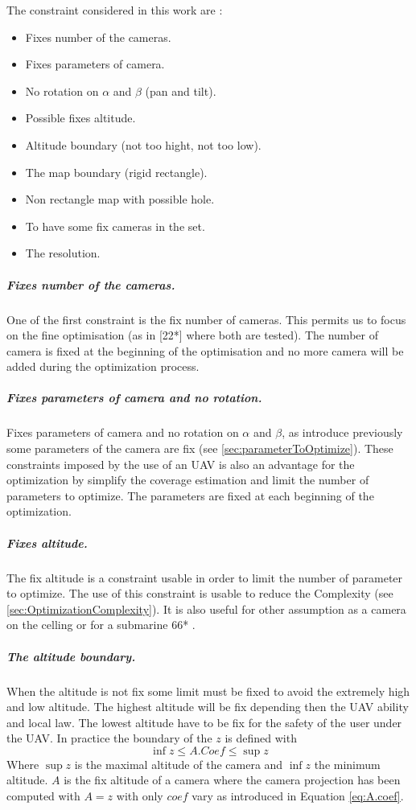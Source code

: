 The constraint considered in this work are : 
\begin{itemize}
	\item Fixes number of the cameras.
	\item Fixes parameters of camera.
	\item No rotation  on  $\alpha$ and $\beta$ (pan and tilt).
	\item Possible fixes altitude.
	\item Altitude boundary (not too hight, not too low).  	
	\item The map boundary (rigid rectangle).  
	\item Non rectangle map with possible hole.
	\item To have some fix cameras in the set. 

	\item The resolution.\\

\end{itemize} 
\subparagraph{Fixes number of the cameras.}
One of the first constraint is the fix number of cameras. This permits us to focus on the fine optimisation (as in  [22*] where both are tested). The number of camera is fixed at the beginning of the optimisation and no more camera will be added during the optimization process.  \\

\subparagraph{Fixes parameters of camera and no rotation.}
Fixes parameters of camera and no rotation  on  $\alpha$ and $\beta$, as introduce previously some parameters of the camera are fix (see \ref{sec:parameterToOptimize}). These constraints imposed by the use of an UAV is also an advantage for the optimization by simplify the coverage estimation and limit the number of parameters to optimize. The parameters are fixed at each beginning of the optimization.\\

\subparagraph{Fixes altitude.}
 The fix altitude is a constraint usable in order to limit the number of parameter to optimize. The use of this constraint is usable to reduce the Complexity (see \ref{sec:OptimizationComplexity}).  It is also useful for other assumption as a camera on the celling or for a submarine 66* \cite{66*}.\\

\subparagraph{The altitude boundary.}\label{sec:altitudeBoundary}
 When the altitude is not fix  some limit must be fixed to avoid the extremely high and low altitude. The highest altitude will be fix depending then the UAV ability and local law. The lowest altitude have to be fix for the safety of the user under the UAV.  
In practice the boundary of the $z$ is defined  with 
 \begin{equation}\label{eq:boundaryZ}
   \inf z\leq A.Coef\leq \sup z  
 \end{equation} 
 Where $\sup z$ is the maximal altitude of the camera and $\inf z$ the minimum altitude. $A$ is the fix altitude  of a camera where the camera projection has been computed with $A=z$ with only $coef$  vary as introduced in Equation \ref{eq:A.coef}. \\ 
 
